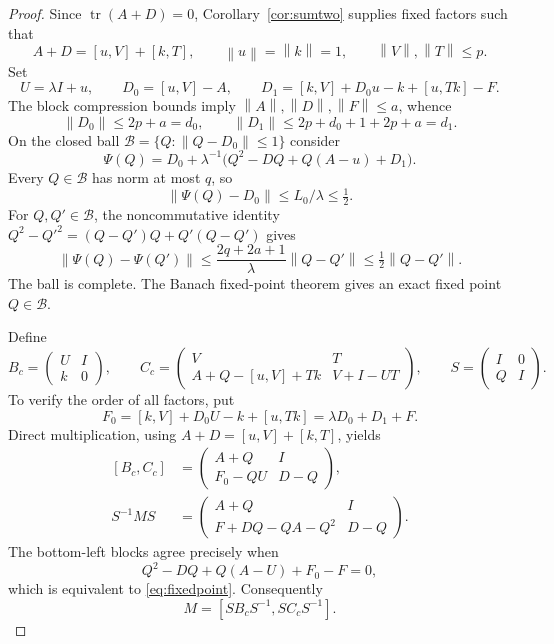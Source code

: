 \documentclass[11pt]{article}
\theoremstyle{remark}
\newcommand{\tr}{\operatorname{tr}}
\newcommand{\norm}[1]{\left\lVert#1\right\rVert}
\newcommand{\comm}[2]{[#1,#2]}
\numberwithin{equation}{section}
\begin{document}
\begin{proof}
Since $\tr(A+D)=0$, Corollary~\ref{cor:sumtwo} supplies fixed factors such that
\[
 A+D=\comm uV+\comm kT,\qquad
 \norm u=\norm k=1,\qquad \norm V,\norm T\le p.
\]
Set
\begin{equation}\label{eq:defects}
 U=\lambda I+u,\qquad D_0=\comm uV-A,\qquad
 D_1=\comm kV+D_0u-k+\comm u{Tk}-F.
\end{equation}
The block compression bounds imply $\norm A,\norm D,\norm F\le a$, whence
\[
 \norm{D_0}\le2p+a=d_0,\qquad
 \norm{D_1}\le2p+d_0+1+2p+a=d_1.
\]
On the closed ball $\mathcal B=\{Q:\norm{Q-D_0}\le1\}$ consider
\begin{equation}\label{eq:fixedpoint}
 \Psi(Q)=D_0+\lambda^{-1}
       \bigl(Q^2-DQ+Q(A-u)+D_1\bigr).
\end{equation}
Every $Q\in\mathcal B$ has norm at most $q$, so
\[
 \norm{\Psi(Q)-D_0}\le L_0/\lambda\le\tfrac12.
\]
For $Q,Q'\in\mathcal B$, the noncommutative identity
$Q^2-Q'^2=(Q-Q')Q+Q'(Q-Q')$ gives
\[
 \norm{\Psi(Q)-\Psi(Q')}\le
 \frac{2q+2a+1}{\lambda}\norm{Q-Q'}\le\tfrac12\norm{Q-Q'}.
\]
The ball is complete. The Banach fixed-point theorem gives an exact fixed point
$Q\in\mathcal B$.

Define
\begin{equation}\label{eq:companions}
 B_c=\begin{pmatrix}U&I\\k&0\end{pmatrix},\qquad
 C_c=\begin{pmatrix}
 V&T\\ A+Q-\comm uV+Tk&V+I-UT
 \end{pmatrix},\qquad
 S=\begin{pmatrix}I&0\\Q&I\end{pmatrix}.
\end{equation}
To verify the order of all factors, put
\[
 F_0=\comm kV+D_0U-k+\comm u{Tk}
     =\lambda D_0+D_1+F.
\]
Direct multiplication, using $A+D=\comm uV+\comm kT$, yields
\begin{equation}\label{eq:fourblocks}
\begin{aligned}
 \comm{B_c}{C_c}
  &=\begin{pmatrix}A+Q&I\\F_0-QU&D-Q\end{pmatrix},\\
 S^{-1}MS
  &=\begin{pmatrix}A+Q&I\\F+DQ-QA-Q^2&D-Q\end{pmatrix}.
\end{aligned}
\end{equation}
The bottom-left blocks agree precisely when
\[
 Q^2-DQ+Q(A-U)+F_0-F=0,
\]
which is equivalent to \eqref{eq:fixedpoint}. Consequently
\begin{equation}\label{eq:corecomm}
 M=\comm{SB_cS^{-1}}{SC_cS^{-1}}.
\end{equation}


\end{proof}
\end{document}
